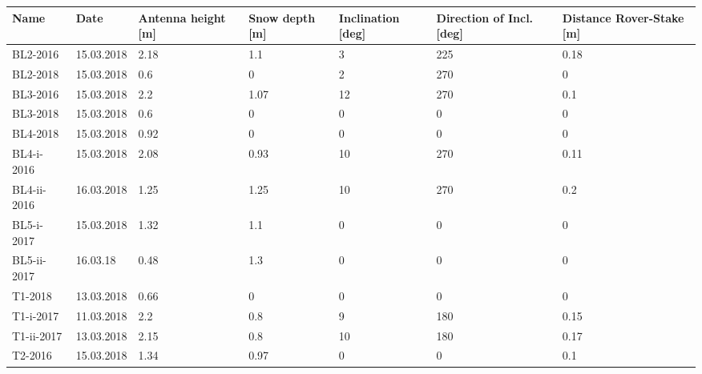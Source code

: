 \begin{tabular}{lllllll}
\toprule
        Name &        Date & Antenna height [m] & Snow depth [m] & Inclination [deg] & Direction of Incl. [deg] & Distance Rover-Stake [m] \\
\midrule
    BL2-2016 &  15.03.2018 &               2.18 &            1.1 &                 3 &                      225 &                     0.18 \\
    BL2-2018 &  15.03.2018 &                0.6 &              0 &                 2 &                      270 &                        0 \\
    BL3-2016 &  15.03.2018 &                2.2 &           1.07 &                12 &                      270 &                      0.1 \\
    BL3-2018 &  15.03.2018 &                0.6 &              0 &                 0 &                        0 &                        0 \\
    BL4-2018 &  15.03.2018 &               0.92 &              0 &                 0 &                        0 &                        0 \\
  BL4-i-2016 &  15.03.2018 &               2.08 &           0.93 &                10 &                      270 &                     0.11 \\
 BL4-ii-2016 &  16.03.2018 &               1.25 &           1.25 &                10 &                      270 &                      0.2 \\
  BL5-i-2017 &  15.03.2018 &               1.32 &            1.1 &                 0 &                        0 &                        0 \\
 BL5-ii-2017 &    16.03.18 &               0.48 &            1.3 &                 0 &                        0 &                        0 \\
     T1-2018 &  13.03.2018 &               0.66 &              0 &                 0 &                        0 &                        0 \\
   T1-i-2017 &  11.03.2018 &                2.2 &            0.8 &                 9 &                      180 &                     0.15 \\
  T1-ii-2017 &  13.03.2018 &               2.15 &            0.8 &                10 &                      180 &                     0.17 \\
     T2-2016 &  15.03.2018 &               1.34 &           0.97 &                 0 &                        0 &                      0.1 \\

\end{tabular}
